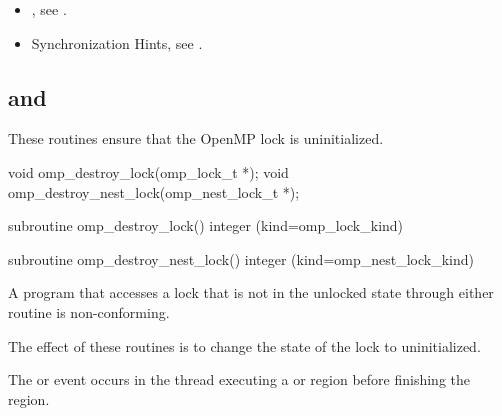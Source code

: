 \crossreferences
\begin{itemize}
\item {}, see
.
\item Synchronization Hints, see .
\end{itemize}



\subsection[\code{omp\_destroy\_lock} and \code{omp\_destroy\_nest\_lock}]{ and\\ }
\label{subsec:omp_destroy_lock and omp_destroy_nest_lock}
\summary
These routines ensure that the OpenMP lock is uninitialized.

\format
\begin{ccppspecific}
\begin{boxedcode}
void omp\_destroy\_lock(omp\_lock\_t *);
void omp\_destroy\_nest\_lock(omp\_nest\_lock\_t *);
\end{boxedcode}
\end{ccppspecific}

\begin{fortranspecific}
\begin{boxedcode}
subroutine omp\_destroy\_lock()
integer (kind=omp\_lock\_kind) 

subroutine omp\_destroy\_nest\_lock()
integer (kind=omp\_nest\_lock\_kind) 
\end{boxedcode}
\end{fortranspecific}

\constraints
A program that accesses a lock that is not in the unlocked state through either routine is 
non-conforming.

\effect
The effect of these routines is to change the state of the lock to uninitialized.

\events

The  or  event occurs in the thread 
executing a  or  region
before finishing the region.

\tools


